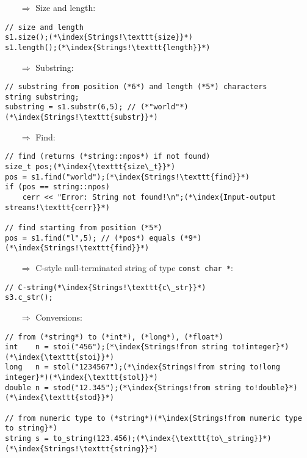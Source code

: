 \documentclass[10pt]{article}
\begin{document}
\begin{enumerate}
\item[$\Rightarrow$] Size and length:
\end{enumerate}
\begin{lstlisting}
// size and length
s1.size();(*\index{Strings!\texttt{size}}*)
s1.length();(*\index{Strings!\texttt{length}}*)
\end{lstlisting}
\begin{enumerate}
\item[$\Rightarrow$] Substring:
\end{enumerate}
\begin{lstlisting}
// substring from position (*6*) and length (*5*) characters
string substring;
substring = s1.substr(6,5); // (*"world"*)(*\index{Strings!\texttt{substr}}*)
\end{lstlisting}
\begin{enumerate}
\item[$\Rightarrow$] Find:
\end{enumerate}
\begin{lstlisting}
// find (returns (*string::npos*) if not found)
size_t pos;(*\index{\texttt{size\_t}}*)
pos = s1.find("world");(*\index{Strings!\texttt{find}}*)
if (pos == string::npos)
    cerr << "Error: String not found!\n";(*\index{Input-output streams!\texttt{cerr}}*)

// find starting from position (*5*)
pos = s1.find("l",5); // (*pos*) equals (*9*) (*\index{Strings!\texttt{find}}*)
\end{lstlisting}
\begin{enumerate}
\item[$\Rightarrow$] C-style null-terminated string of type \texttt{const char *}:
\end{enumerate}
\begin{lstlisting}
// C-string(*\index{Strings!\texttt{c\_str}}*)
s3.c_str();
\end{lstlisting}
\begin{enumerate}
\item[$\Rightarrow$] Conversions:
\end{enumerate}
\begin{lstlisting}
// from (*string*) to (*int*), (*long*), (*float*)
int    n = stoi("456");(*\index{Strings!from string to!integer}*)(*\index{\texttt{stoi}}*)
long   n = stol("1234567");(*\index{Strings!from string to!long integer}*)(*\index{\texttt{stol}}*)
double n = stod("12.345");(*\index{Strings!from string to!double}*)(*\index{\texttt{stod}}*)

// from numeric type to (*string*)(*\index{Strings!from numeric type to string}*)
string s = to_string(123.456);(*\index{\texttt{to\_string}}*)(*\index{Strings!\texttt{string}}*)
\end{lstlisting}
%
%
\end{document}
